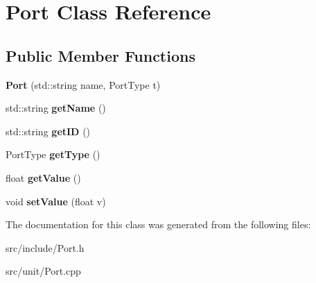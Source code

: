 \hypertarget{classPort}{\section{Port Class Reference}
\label{classPort}
}
\subsection*{Public Member Functions}
\begin{DoxyCompactItemize}
\item 
\hypertarget{classPort_aadff8efe873e31b3362dda2b4a28c8c9}{{\bfseries Port} (std\-::string name, Port\-Type t)}\label{classPort_aadff8efe873e31b3362dda2b4a28c8c9}

\item 
\hypertarget{classPort_ad2c3baf0b291aee3b5b65178231754a6}{std\-::string {\bfseries get\-Name} ()}\label{classPort_ad2c3baf0b291aee3b5b65178231754a6}

\item 
\hypertarget{classPort_a31744528a5ade68a59ce094f3797bc1e}{std\-::string {\bfseries get\-I\-D} ()}\label{classPort_a31744528a5ade68a59ce094f3797bc1e}

\item 
\hypertarget{classPort_a5859f5d788d56c0103f4274b6d62b725}{Port\-Type {\bfseries get\-Type} ()}\label{classPort_a5859f5d788d56c0103f4274b6d62b725}

\item 
\hypertarget{classPort_a101b9cfba62777fb61c35a642b63f25a}{float {\bfseries get\-Value} ()}\label{classPort_a101b9cfba62777fb61c35a642b63f25a}

\item 
\hypertarget{classPort_afc93a217ba756e559c157b66745823a7}{void {\bfseries set\-Value} (float v)}\label{classPort_afc93a217ba756e559c157b66745823a7}

\end{DoxyCompactItemize}


The documentation for this class was generated from the following files\-:\begin{DoxyCompactItemize}
\item 
src/include/Port.\-h\item 
src/unit/Port.\-cpp\end{DoxyCompactItemize}
